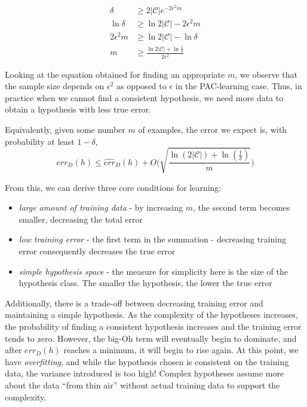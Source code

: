 \documentclass{article}
\begin{document}
\begin{align*}
    \delta &\geq 2|\mathcal{C}|e^{-2\epsilon^2 m}\\
    \ln \delta &\geq \ln 2|\mathcal{C}| - 2\epsilon^2 m\\
    2\epsilon^2 m &\geq \ln 2 |\mathcal{C}| - \ln \delta\\
    m &\geq \frac{\ln 2 |\mathcal{C}| + \ln \frac{1}{\delta}}{2\epsilon^2}
\end{align*}

Looking at the equation obtained for finding an appropriate $m$, we
observe that the sample size depends on $\epsilon^2$ as opposed to
$\epsilon$ in the PAC-learning case. Thus, in practice when we cannot
find a consistent hypothesis, we need more data to obtain a hypothesis
with less true error.

Equivalently, given some number $m$ of examples, the error we expect is,
with probability at least $1 - \delta$,
$$err_D(h) \leq \hat{err}_D(h) + O\bigg(\sqrt{\frac{\ln(2|\mathcal{C}|)
+ \ln(\frac{1}{\delta})}{m}}\bigg)$$

From this, we can derive three core conditions for learning:

\begin{itemize}
    \item \emph{large amount of training data} - by increasing $m$, the
    second term becomes smaller, decreasing the total error
    \item \emph{low training error} - the first term in the summation -
    decreasing training error consequently decreases the true error
    \item \emph{simple hypothesis space} - the measure for simplicity
    here is the size of the hypothesis class. The smaller the hypothesis,
    the lower the true error
\end{itemize}

Additionally, there is a trade-off between decreasing training error and
maintaining a simple hypothesis. As the complexity of the hypotheses
increases, the probability of finding a consistent hypothesis increases
and the training error tends to zero. However, the big-Oh term will
eventually begin to dominate, and after $err_D(h)$ reaches a minimum, it
will begin to rise again. At this point, we have \emph{overfitting}, and
while the hypothesis chosen is consistent on the
training data, the variance introduced is too high! Complex hypotheses
assume more about the data ``from thin air'' without actual training data
to support the complexity.
\end{document}
